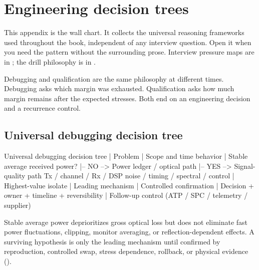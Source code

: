 \chapter{Engineering decision trees}
\label{app:decision-trees}

This appendix is the wall chart. It collects the universal reasoning frameworks
used throughout the book, independent of any interview question. Open it when
you need the pattern without the surrounding prose. Interview pressure maps are
in ; the drill philosophy is in
.

Debugging and qualification are the same philosophy at different times.
Debugging asks which margin was exhausted. Qualification asks how much margin
remains after the expected stresses. Both end on an engineering decision and a
recurrence control.

\section{Universal debugging decision tree}
\label{sec:tree-debugging}

\begin{dectree}
Universal debugging decision tree
  |
Problem
  |
Scope and time behavior
  |
Stable average received power?
  |-- NO  --> Power ledger / optical path
  |-- YES --> Signal-quality path
              Tx / channel / Rx / DSP
              noise / timing / spectral / control
  |
Highest-value isolate
  |
Leading mechanism
  |
Controlled confirmation
  |
Decision + owner + timeline + reversibility
  |
Follow-up control (ATP / SPC / telemetry / supplier)
\end{dectree}

Stable average power deprioritizes gross optical loss but does not eliminate
fast power fluctuations, clipping, monitor averaging, or reflection-dependent
effects. A surviving hypothesis is only the leading mechanism until confirmed by
reproduction, controlled swap, stress dependence, rollback, or physical
evidence ().



